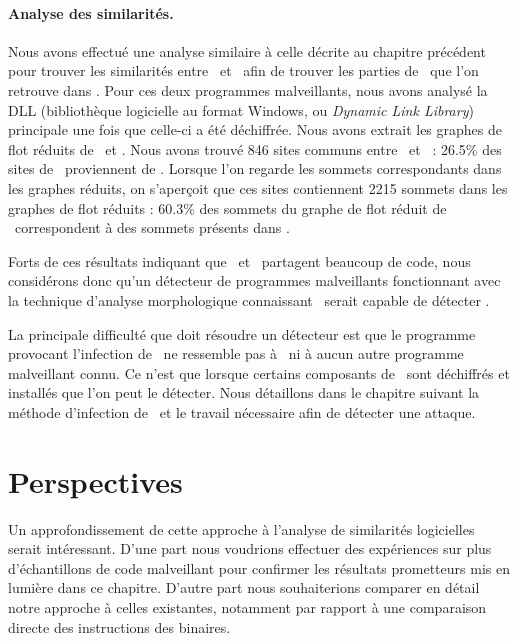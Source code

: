 \paragraph{Analyse des similarités.}
Nous avons effectué une analyse similaire à celle décrite au chapitre précédent pour trouver les similarités entre \stux\ et \duqu\ afin de trouver les parties de \stux\ que l'on retrouve dans \duqu.
Pour ces deux programmes malveillants, nous avons analysé la DLL (bibliothèque logicielle au format Windows, ou \emph{Dynamic Link Library}) principale une fois que celle-ci a été déchiffrée.
Nous avons extrait les graphes de flot réduits de \duqu\ et \stux.
Nous avons trouvé 846 sites communs entre \duqu\ et \stux\ : 26.5\% des sites de \duqu\ proviennent de \stux.
Lorsque l'on regarde les sommets correspondants dans les graphes réduits, on s'aperçoit que ces sites contiennent 2215 sommets dans les graphes de flot réduits : 60.3\% des sommets du graphe de flot réduit de \duqu\ correspondent à des sommets  présents dans \stux.

Forts de ces résultats indiquant que \duqu\ et \stux\ partagent beaucoup de code, nous considérons donc qu'un détecteur de programmes malveillants fonctionnant avec la technique d'analyse morphologique connaissant \stux\ serait capable de détecter \duqu.

La principale difficulté que doit résoudre un détecteur est que le programme provocant l'infection de \duqu\ ne ressemble pas à \stux\ ni à aucun autre programme malveillant connu. Ce n'est que lorsque certains composants de \duqu\ sont déchiffrés et installés que l'on peut le détecter.
Nous détaillons dans le chapitre suivant la méthode d'infection de \duqu\ et le travail nécessaire afin de détecter une attaque.


\section{Perspectives}
Un approfondissement de cette approche à l'analyse de similarités logicielles serait intéressant. D'une part nous voudrions effectuer des expériences sur plus d'échantillons de code malveillant pour confirmer les résultats prometteurs mis en lumière dans ce chapitre.
D'autre part nous souhaiterions comparer en détail notre approche à celles existantes, notamment par rapport à une comparaison directe des instructions des binaires.

